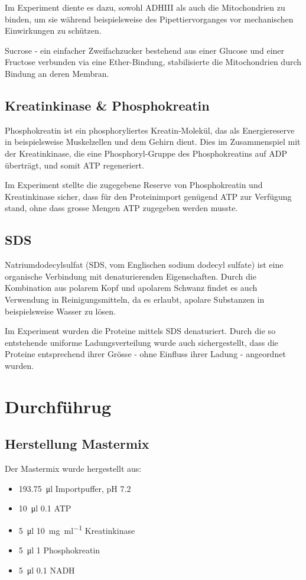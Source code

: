 \documentclass[a4paper,german]{scrreprt}
\begin{document}
Im Experiment diente es dazu, sowohl ADHIII als auch die Mitochondrien zu
binden, um sie während beispielsweise des Pipettiervorganges vor mechanischen
Einwirkungen zu schützen.

Sucrose - ein einfacher Zweifachzucker bestehend aus einer Glucose und einer
Fructose verbunden via eine Ether-Bindung, stabilisierte die Mitochondrien
durch Bindung an deren Membran.

\section{Kreatinkinase \& Phosphokreatin}

Phosphokreatin ist ein phosphoryliertes Kreatin-Molekül, das als Energiereserve
in beispielsweise Muskelzellen und dem Gehirn dient. Dies im Zusammenspiel mit
der Kreatinkinase, die eine Phosphoryl-Gruppe des Phosphokreatins auf ADP
überträgt, und somit ATP regeneriert.

Im Experiment stellte die zugegebene Reserve von Phosphokreatin und
Kreatinkinase sicher, dass für den Proteinimport genügend ATP zur Verfügung
stand, ohne dass grosse Mengen ATP zugegeben werden musste.

\section{SDS}

Natriumdodecylsulfat (SDS, vom Englischen sodium dodecyl sulfate) ist eine
organische Verbindung mit denaturierenden Eigenschaften. Durch die Kombination
aus polarem Kopf und apolarem Schwanz findet es auch Verwendung in
Reinigungsmitteln, da es erlaubt, apolare Substanzen in beispielsweise Wasser
zu lösen.

Im Experiment wurden die Proteine mittels SDS denaturiert. Durch die so
entstehende uniforme Ladungsverteilung wurde auch sichergestellt, dass die
Proteine entsprechend ihrer Grösse - ohne Einfluss ihrer Ladung - angeordnet
wurden.

\chapter{Durchführug}

\section{Herstellung Mastermix}

Der Mastermix wurde hergestellt aus:
\begin{itemize}
	\item \SI{193.75}{\ul} Importpuffer, pH 7.2
	\item \SI{10}{\ul} \SI{0.1}{\Molar} ATP
	\item \SI{5}{\ul} \SI{10}{\mg \per \ml} Kreatinkinase
	\item \SI{5}{\ul} \SI{1}{\Molar} Phosphokreatin
	\item \SI{5}{\ul} \SI{0.1}{\Molar} NADH
\end{itemize}
\end{document}
